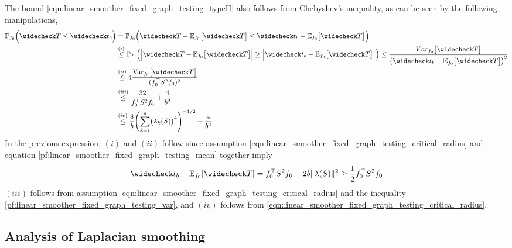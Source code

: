 The bound \eqref{eqn:linear_smoother_fixed_graph_testing_typeII} also follows from Chebyshev's inequality, as can be seen by the following manipulations,
\begin{equation*}
\begin{aligned}
\Pbb_{f_0}\Bigl(\wc{T} \leq \wc{t}_b\Bigr) & = \Pbb_{f_0}\Bigl(\wc{T} - \Ebb_{f_0}\bigl[\wc{T}\bigr] \leq \wc{t}_b - \Ebb_{f_0}\bigl[\wc{T}\bigr]\Bigr) \\
& \overset{(i)}{\leq} \Pbb_{f_0}\Bigl(\Bigl|\wc{T} - \Ebb_{f_0}\bigl[\wc{T}\bigr]\Bigr| \geq \Bigl|\wc{t}_b - \Ebb_{f_0}\bigl[\wc{T}\bigr]\Bigr|\Bigr) \leq \frac{Var_{f_0}\bigl[\wc{T}\bigr]}{\bigl(\wc{t}_b - \Ebb_{f_0}\bigl[\wc{T}\bigr]\bigr)^2} \\ 
& \overset{(ii)}{\leq} 4 \frac{\Var_{f_0}\bigl[\wc{T}\bigr]}{(f_0^{\top} S^2 f_0)^2} \\
& \overset{(iii)}{\leq} \frac{32}{f_0^{\top} S^2 f_0} + \frac{4}{b^2} \\
& \overset{(iv)}{\leq} \frac{8}{b} \Biggl(\sum_{k = 1}^{n}\bigl(\lambda_k(S)\bigr)^4\Biggr)^{-1/2} + \frac{4}{b^2}
\end{aligned}
\end{equation*}
In the previous expression, $(i)$ and $(ii)$ follow since assumption \eqref{eqn:linear_smoother_fixed_graph_testing_critical_radius} and equation \eqref{pf:linear_smoother_fixed_graph_testing_mean} together imply 
\begin{equation*}
\wc{t}_b - \Ebb_{f_0}[\wc{T}] = f_0^{\top} S^2 f_0 - 2b\|{\bf \lambda}(S)\|_4^2 \geq \frac{1}{2}f_0^{\top} S^2 f_0
\end{equation*}
$(iii)$ follows from assumption \eqref{eqn:linear_smoother_fixed_graph_testing_critical_radius} and the inequality \eqref{pf:linear_smoother_fixed_graph_testing_var}, and $(iv)$ follows from \eqref{eqn:linear_smoother_fixed_graph_testing_critical_radius}. 

\subsection{Analysis of Laplacian smoothing}

